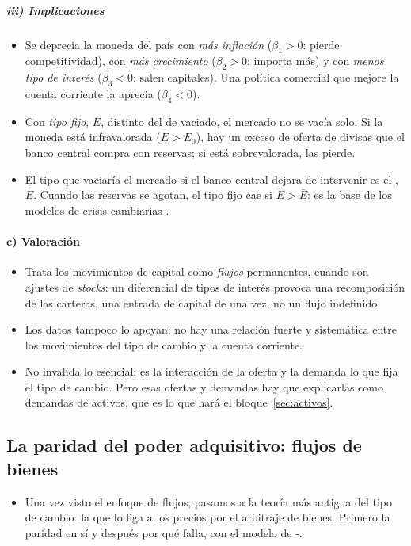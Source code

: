 \documentclass[11pt]{article}
\begin{document}
\subparagraph{iii) Implicaciones}
\begin{itemize}
\item Se deprecia la moneda del país con \emph{más inflación} ($\beta_1>0$: pierde competitividad), con \emph{más crecimiento} ($\beta_2>0$: importa más) y con \emph{menos tipo de interés} ($\beta_3<0$: salen capitales). Una política comercial que mejore la cuenta corriente la aprecia ($\beta_4<0$).
\item Con \emph{tipo fijo}, $\bar E$, distinto del de vaciado, el mercado no se vacía solo. Si la moneda está infravalorada ($\bar E>E_0$), hay un exceso de oferta de divisas que el banco central compra con reservas; si está sobrevalorada, las pierde.
\item El tipo que vaciaría el mercado si el banco central dejara de intervenir es el , $\tilde E$. Cuando las reservas se agotan, el tipo fijo cae si $\tilde E>\bar E$: es la base de los modelos de crisis cambiarias .
\end{itemize}

\paragraph{c) Valoración}
\begin{itemize}
\item Trata los movimientos de capital como \emph{flujos} permanentes, cuando son ajustes de \emph{stocks}: un diferencial de tipos de interés provoca una recomposición de las carteras, una entrada de capital de una vez, no un flujo indefinido.
\item Los datos tampoco lo apoyan: no hay una relación fuerte y sistemática entre los movimientos del tipo de cambio y la cuenta corriente\nocite{Mussa1984Theory}.
\item No invalida lo esencial: es la interacción de la oferta y la demanda lo que fija el tipo de cambio. Pero esas ofertas y demandas hay que explicarlas como demandas de activos, que es lo que hará el bloque~\ref{sec:activos}.
\end{itemize}

\subsection{La paridad del poder adquisitivo: flujos de bienes}\label{sec:ppa}

\begin{itemize}
\item Una vez visto el enfoque de flujos, pasamos a la teoría más antigua del tipo de cambio: la que lo liga a los precios por el arbitraje de bienes. Primero la paridad en sí y después por qué falla, con el modelo de -.
\end{itemize}
\end{document}

